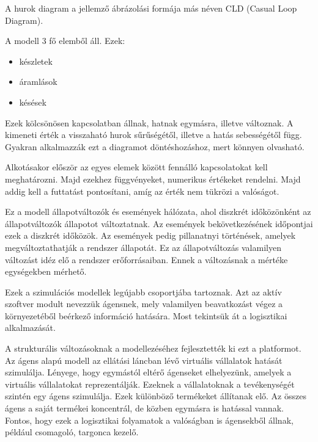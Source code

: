 A hurok diagram a jellemző ábrázolási formája más néven CLD (Casual Loop Diagram).

A modell 3 fő elemből áll.
Ezek:

\begin{itemize}
	\item készletek
	\item  áramlások
	\item  késések
\end{itemize}


Ezek kölcsönösen kapcsolatban állnak, hatnak egymásra, illetve változnak.
A kimeneti érték a visszaható hurok sűrűségétől, illetve a hatás sebességétől függ. 
Gyakran alkalmazzák ezt a diagramot döntéshozáshoz, mert könnyen olvasható.

Alkotásakor először az egyes elemek között fennálló kapcsolatokat kell meghatározni. Majd ezekhez függvényeket, numerikus értékeket rendelni. Majd addig kell a futtatást pontosítani, amíg az érték nem tükrözi a valóságot. 




Ez a modell állapotváltozók és események hálózata, ahol diszkrét időközönként az állapotváltozók állapotot változtatnak.
Az események bekövetkezésének időpontjai ezek a diszkrét időközök. Az események pedig pillanatnyi történések, amelyek megváltoztathatják a rendszer állapotát.
Ez az állapotváltozás valamilyen változást idéz elő a rendszer erőforrásaiban. Ennek a változásnak a mértéke egységekben mérhető.


Ezek a szimulációs modellek legújabb csoportjába tartoznak. Azt az aktív szoftver modult nevezzük ágensnek, mely valamilyen beavatkozást végez a környezetéből beérkező információ hatására. 
Most tekintsük át a logisztikai alkalmazását. 

A strukturális változásoknak a modellezéséhez fejlesztették ki ezt a platformot. Az ágens alapú modell az ellátási láncban lévő virtuális vállalatok hatását szimulálja. Lényege, hogy egymástól eltérő ágenseket elhelyezünk, amelyek a virtuális vállalatokat reprezentálják. Ezeknek a vállalatoknak a tevékenységét szintén egy ágens szimulálja. Ezek különböző termékeket állítanak elő. Az összes ágens a saját termékei koncentrál, de közben egymásra is hatással vannak. Fontos, hogy ezek a logisztikai folyamatok a valóságban is ágensekből állnak, például csomagoló, targonca kezelő. 


